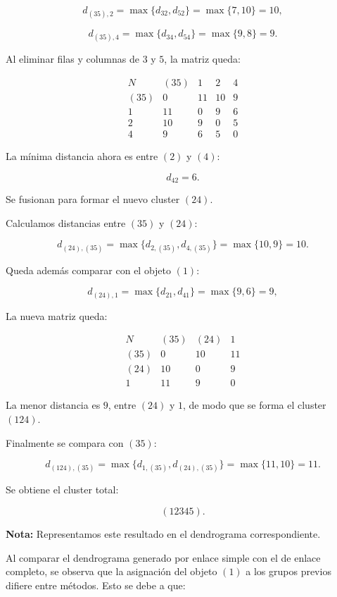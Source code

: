 \documentclass[
]{book}
\begin{document}
\[
d_{(35),2} = \max\{d_{32}, d_{52}\} = \max\{7, 10\} = 10,
\]

\[
d_{(35),4} = \max\{d_{34}, d_{54}\} = \max\{9, 8\} = 9.
\]

Al eliminar filas y columnas de \(3\) y \(5\), la matriz queda:

\[
\begin{array}{c|cccc}
N & (35) & 1 & 2 & 4 \\
\hline
(35) & 0 & 11 & 10 & 9 \\
1 & 11 & 0 & 9 & 6 \\
2 & 10 & 9 & 0 & 5 \\
4 & 9 & 6 & 5 & 0
\end{array}
\]

La mínima distancia ahora es entre \((2)\) y \((4)\):

\[
d_{42} = 6.
\]

Se fusionan para formar el nuevo cluster \((24)\).

Calculamos distancias entre \((35)\) y \((24)\):

\[
d_{(24),(35)} = \max\{d_{2,(35)}, d_{4,(35)}\} = \max\{10, 9\} = 10.
\]

Queda además comparar con el objeto \((1)\):

\[
d_{(24),1} = \max\{d_{21}, d_{41}\} = \max\{9, 6\} = 9,
\]

La nueva matriz queda:

\[
\begin{array}{c|ccc}
 N & (35) & (24) & 1 \\
\hline
(35) & 0 & 10 & 11 \\
(24) & 10 & 0 & 9 \\
1 & 11 & 9 & 0
\end{array}
\]

La menor distancia es \(9\), entre \((24)\) y \(1\), de modo que se forma el cluster \((124)\).

Finalmente se compara con \((35)\):

\[
d_{(124),(35)} = \max\{ d_{1,(35)}, d_{(24),(35)}\} = \max\{11, 10\} = 11.
\]

Se obtiene el cluster total:

\[
(12345).
\]

\textbf{Nota:} Representamos este resultado en el dendrograma correspondiente.

Al comparar el dendrograma generado por enlace simple con el de enlace completo, se observa que la asignación del objeto \((1)\) a los grupos previos difiere entre métodos. Esto se debe a que:
\end{document}
